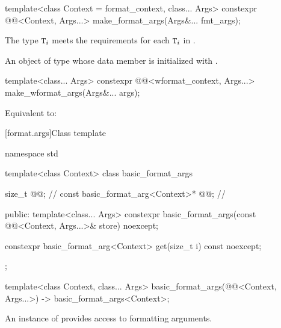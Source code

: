 %
\begin{itemdecl}
template<class Context = format_context, class... Args>
  constexpr @@<Context, Args...>
    make_format_args(Args&... fmt_args);
\end{itemdecl}

\begin{itemdescr}
\pnum
\expects
The type
$\tcode{T}_i$\tcode{>>}\linebreak{}
meets the  requirements
for each $\tcode{T}_i$ in .

\pnum
\returns
An object of type 
whose  data member is initialized with
.
\end{itemdescr}

%
\begin{itemdecl}
template<class... Args>
  constexpr @@<wformat_context, Args...>
    make_wformat_args(Args&... args);
\end{itemdecl}

\begin{itemdescr}
\pnum
\effects
Equivalent to:
\end{itemdescr}

[format.args]{Class template }

\begin{codeblock}
namespace std {
  template<class Context>
  class basic_format_args {
    size_t @@;                               // \expos
    const basic_format_arg<Context>* @@;     // \expos

  public:
    template<class... Args>
      constexpr basic_format_args(const @@<Context, Args...>& store) noexcept;

    constexpr basic_format_arg<Context> get(size_t i) const noexcept;
  };

  template<class Context, class... Args>
    basic_format_args(@@<Context, Args...>) -> basic_format_args<Context>;
}
\end{codeblock}

\pnum
An instance of  provides access to formatting
arguments.

